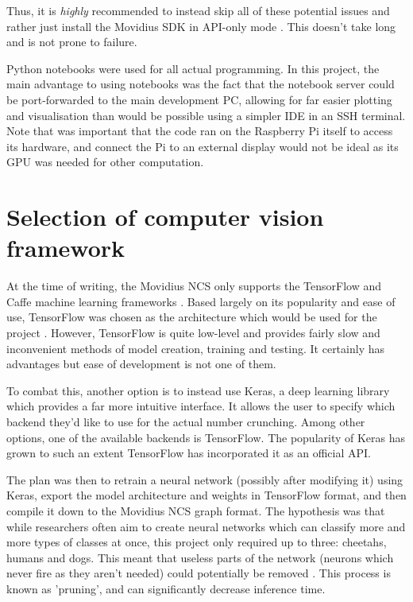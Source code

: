 Thus, it is \emph{highly} recommended to instead skip all of these potential issues and rather just install the Movidius SDK in API-only mode \cite{movidius_api_only}. This doesn't take long and is not prone to failure.

Python notebooks were used for all actual programming. In this project, the main advantage to using notebooks was the fact that the notebook server could be port-forwarded to the main development PC, allowing for far easier plotting and visualisation than would be possible using a simpler IDE in an SSH terminal. Note that was important that the code ran on the Raspberry Pi itself to access its hardware, and connect the Pi to an external display would not be ideal as its GPU was needed for other computation.


\section{Selection of computer vision framework}
At the time of writing, the Movidius NCS only supports the TensorFlow and Caffe machine learning frameworks \cite{website:movidius_install}. Based largely on its popularity and ease of use, TensorFlow was chosen as the architecture which would be used for the project \cite{website:tensorflow_popularity}. However, TensorFlow is quite low-level and provides fairly slow and inconvenient methods of model creation, training and testing. It certainly has advantages but ease of development is not one of them.

To combat this, another option is to instead use Keras, a deep learning library which provides a far more intuitive interface. It allows the user to specify which backend they'd like to use for the actual number crunching. Among other options, one of the available backends is TensorFlow. The popularity of Keras has grown to such an extent TensorFlow has incorporated it as an official API.

The plan was then to retrain a neural network (possibly after modifying it) using Keras, export the model architecture and weights in TensorFlow format, and then compile it down to the Movidius NCS graph format. The hypothesis was that while researchers often aim to create neural networks which can classify more and more types of classes at once, this project only required up to three: cheetahs, humans and dogs. This meant that useless parts of the network (neurons which never fire as they aren't needed) could potentially be removed \cite{molchanov2016pruning}. This process is known as 'pruning', and can significantly decrease inference time.

